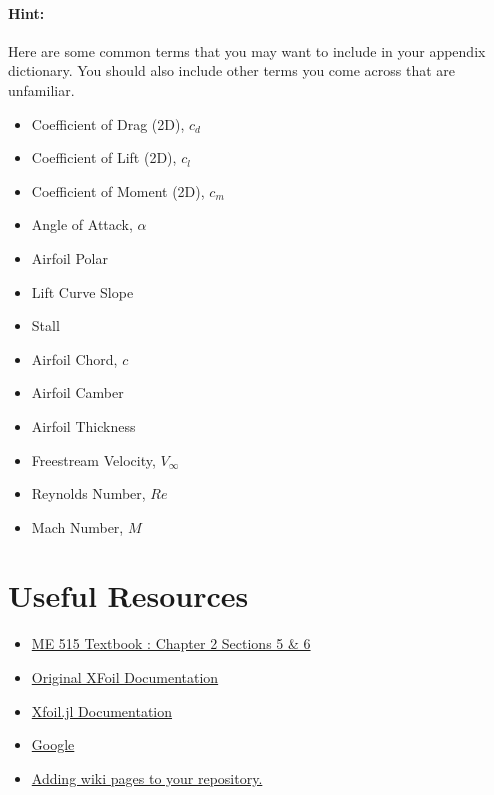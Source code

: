 \documentclass[12pt]{article}
\begin{document}
\bigskip

\paragraph{Hint:} Here are some common terms that you may want to include in your appendix dictionary. You should also include other terms you come across that are unfamiliar.

\begin{multicols}{2}
	\begin{itemize}
		\item Coefficient of Drag (2D), $c_d$
		\item Coefficient of Lift (2D), $c_l$
		\item Coefficient of Moment (2D), $c_m$
		\item Angle of Attack, $\alpha$
		\item Airfoil Polar
		\item Lift Curve Slope
		\item Stall
		\item Airfoil Chord, $c$
		\item Airfoil Camber
		\item Airfoil Thickness
		\item Freestream Velocity, $V_\infty$
		\item Reynolds Number, $Re$
		\item Mach Number, $M$
	\end{itemize}
\end{multicols}


\section{Useful Resources}

\begin{itemize}
 	\item \href{https://byu.box.com/shared/static/ywfayozbj3sr2ot6b32u8nqk5brqvurt.pdf}{ME 515 Textbook : Chapter 2 Sections 5 \& 6}
 	\item \href{http://web.mit.edu/drela/Public/web/xfoil/xfoil_doc.txt}{Original XFoil Documentation}
  	\item \href{https://flow.byu.edu/Xfoil.jl/stable/}{Xfoil.jl Documentation}
 	\item \href{https://www.google.com/}{Google}
	\item \href{https://docs.github.com/en/communities/documenting-your-project-with-wikis/adding-or-editing-wiki-pages}{Adding wiki pages to your repository.}
\end{itemize}
\end{document}
